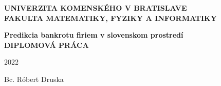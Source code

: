 \thispagestyle{empty}
\begin{center}
{\large \bf UNIVERZITA KOMENSKÉHO V BRATISLAVE \\
FAKULTA MATEMATIKY, FYZIKY A INFORMATIKY}
\end{center}
%

\vspace{2cm}
\begin{figure}[!h]
   \centering
\end{figure}

\vspace{1cm}
\begin{center}
{\large \bf Predikcia bankrotu firiem v slovenskom prostredí \\
\vspace{3cm}
DIPLOMOVÁ PRÁCA}
\end{center}

\vfill
%
\begin{multicols}{2}
{\bf
\begin{flushleft} 2022 \end{flushleft}
\begin{flushright} Bc. Róbert Druska \end{flushright} 
}
\end{multicols}
